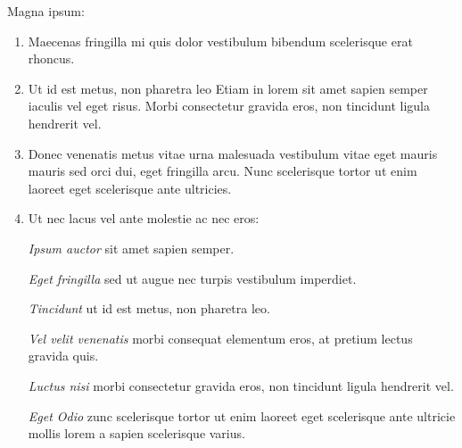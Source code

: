 \documentclass[10pt]{article} %
\begin{document}
\begin{minipage}[t]{.30\linewidth} %


  \begin{mdframed}[style=sidebar,frametitle={}] %


    Magna ipsum:

    \begin{enumerate}
    \item Maecenas fringilla mi quis dolor vestibulum bibendum scelerisque erat
      rhoncus.
    \item Ut id est metus, non pharetra leo Etiam in lorem sit amet sapien
      semper iaculis vel eget risus. Morbi consectetur gravida eros, non
      tincidunt ligula hendrerit vel.
    \item Donec venenatis metus vitae urna malesuada vestibulum vitae eget
      mauris mauris sed orci dui, eget fringilla arcu. Nunc scelerisque tortor
      ut enim laoreet eget scelerisque ante ultricies.
    \item Ut nec lacus vel ante molestie ac nec eros:

      \textsl{Ipsum auctor} sit amet sapien semper.

      \textsl{Eget fringilla} sed ut augue nec turpis vestibulum imperdiet.

      \textsl{Tincidunt} ut id est metus, non pharetra leo.

      \textsl{Vel velit venenatis } morbi consequat elementum eros, at pretium
      lectus gravida quis.

      \textsl{Luctus nisi} morbi consectetur gravida eros, non tincidunt ligula
      hendrerit vel.

      \textsl{Eget Odio} zunc scelerisque tortor ut enim laoreet eget
      scelerisque ante ultricie mollis lorem a sapien scelerisque varius.
    \end{enumerate}

    \BackToContents %

  \end{mdframed}\hfill



\end{minipage}
\end{document}
